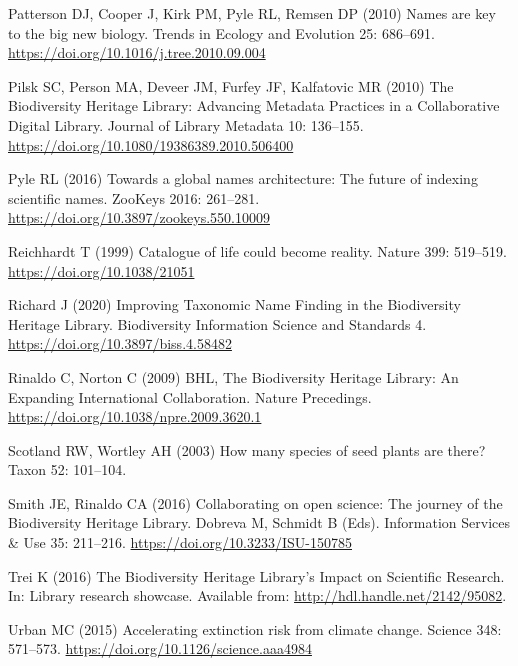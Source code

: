 \documentclass[
]{article}
\newlength{\cslhangindent}
\newlength{\cslentryspacingunit} %
\newenvironment{CSLReferences}[2] %
 {%
  \setlength{\parindent}{0pt}
  \ifodd #1
  \let\oldpar\par
  \def\par{\hangindent=\cslhangindent\oldpar}
  \fi
  \setlength{\parskip}{#2\cslentryspacingunit}
 }%
 {}
\begin{document}
\begin{CSLReferences}{1}{0}
\leavevmode{}%
Patterson DJ, Cooper J, Kirk PM, Pyle RL, Remsen DP (2010) {Names are
key to the big new biology}. Trends in Ecology and Evolution 25:
686--691. \url{https://doi.org/10.1016/j.tree.2010.09.004}

\leavevmode{}%
Pilsk SC, Person MA, Deveer JM, Furfey JF, Kalfatovic MR (2010) {The
Biodiversity Heritage Library: Advancing Metadata Practices in a
Collaborative Digital Library}. Journal of Library Metadata 10:
136--155. \url{https://doi.org/10.1080/19386389.2010.506400}

\leavevmode{}%
Pyle RL (2016) {Towards a global names architecture: The future of
indexing scientific names}. ZooKeys 2016: 261--281.
\url{https://doi.org/10.3897/zookeys.550.10009}

\leavevmode{}%
Reichhardt T (1999) {Catalogue of life could become reality}. Nature
399: 519--519. \url{https://doi.org/10.1038/21051}

\leavevmode{}%
Richard J (2020) {Improving Taxonomic Name Finding in the Biodiversity
Heritage Library}. Biodiversity Information Science and Standards 4.
\url{https://doi.org/10.3897/biss.4.58482}

\leavevmode{}%
Rinaldo C, Norton C (2009) {BHL, The Biodiversity Heritage Library: An
Expanding International Collaboration}. Nature Precedings.
\url{https://doi.org/10.1038/npre.2009.3620.1}

\leavevmode{}%
Scotland RW, Wortley AH (2003) {How many species of seed plants are
there?} Taxon 52: 101--104.

\leavevmode{}%
Smith JE, Rinaldo CA (2016) {Collaborating on open science: The journey
of the Biodiversity Heritage Library}. Dobreva M, Schmidt B (Eds).
Information Services \& Use 35: 211--216.
\url{https://doi.org/10.3233/ISU-150785}

\leavevmode{}%
Trei K (2016) {The Biodiversity Heritage Library's Impact on Scientific
Research}. In: Library research showcase. Available from:
\url{http://hdl.handle.net/2142/95082}.

\leavevmode{}%
Urban MC (2015) {Accelerating extinction risk from climate change}.
Science 348: 571--573. \url{https://doi.org/10.1126/science.aaa4984}


\end{CSLReferences}
\end{document}
